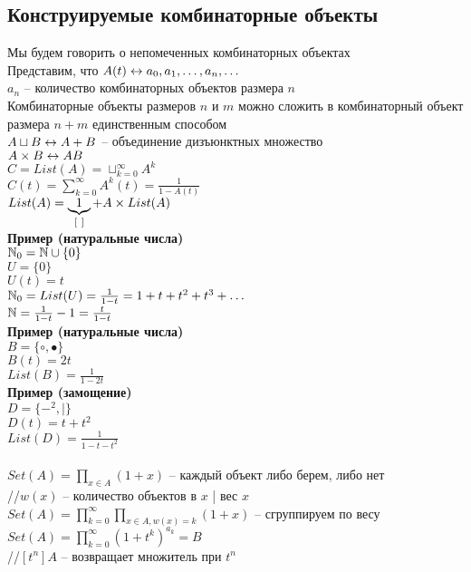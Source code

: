 \documentclass[12pt]{article}
\begin{document}
\subsection{Конструируемые комбинаторные объекты}
Мы будем говорить о непомеченных комбинаторных объектах\\
Представим, что $A(t) \lrto a_0, a_1, \ldots, a_n, \ldots$\\
$a_n$ -- количество комбинаторных объектов размера $n$\\
Комбинаторные объекты размеров $n$ и $m$ можно сложить в комбинаторный объект размера $n+m$ единственным способом\\
$A\sqcup B \lrto A + B$ -- объединение дизъюнктных множество\\
$A \times B \lrto AB$\\
$C = List(A) = \sqcup_{k=0}^\infty A^k$\\
$C(t) = \sum_{k=0}^\infty A^k(t) = \frac{1}{1-A(t)}$\\
$List(A) = \ub{[\ ]}1 + A\times List(A)$\\
\textbf{Пример (натуральные числа)}\\
$\Nset_0 = \Nset \cup \{0\}$\\
$U = \{0\}$\\
$U(t) = t$\\
$\Nset_0 = List(U) = \frac{1}{1-t} = 1 + t + t^2 + t^3 + \ldots$\\
$\Nset = \frac{1}{1-t} - 1 = \frac{t}{1-t}$\\
\textbf{Пример (натуральные числа)}\\
$B=\{\circ, \bullet\}$\\
$B(t) = 2t$\\
$List(B) = \frac{1}{1-2t}$\\
\textbf{Пример (замощение)}\\
$D = \{-^2, \text{|}\}$\\
$D(t) = t + t^2$\\
$List(D) = \frac{1}{1-t-t^2}$\\\\
$Set(A) = \prod_{x\in A} (1+x)$ -- каждый объект либо берем, либо нет\\
//$w(x)$ -- количество объектов в $x$ | вес $x$\\
$Set(A) = \prod_{k=0}^\infty \prod_{x\in A, w(x)=k}(1+x)$ -- сгруппируем по весу\\
$Set(A) = \prod_{k=0}^\infty (1+t^k)^{a_k} = B$\\
//$[t^n]A$ -- возвращает множитель при $t^n$\\
\end{document}
